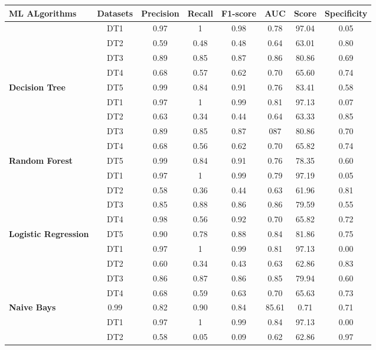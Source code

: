 \begin{table}[h]
\begin{tabular}{|l|c|c|c|c|c|c|c|}
\hline
\cline{2-8}
 \textbf{ML ALgorithms} &  \textbf{Datasets} & \textbf{Precision} & \textbf{Recall} & \textbf{F1-score}&\textbf{AUC} &\textbf{Score}&\textbf{Specificity}\tabularnewline
\hline
\cline{2-8}
 &  DT1 &0.97  & 1   & 0.98 & 0.78 & 97.04 & 0.05 \\
\cline{2-8}
& DT2 & 0.59 &0.48 &0.48  &0.64  &63.01  &0.80\\
\cline{2-8}
& DT3 &0.89  &0.85 &0.87  &0.86  &80.86  &0.69\\
\cline{2-8}
& DT4 &0.68  &0.57 &0.62  &0.70  &65.60  &0.74\\
\cline{2-8}
\multirow{-4}{*}{ \textbf{Decision Tree}}&   DT5 &0.99  &0.84 &0.91  &0.76  &83.41  &0.58\\
\hline
\cline{2-8}
&DT1 &0.97 &1   &0.99 &0.81 &97.13& 0.07\\
\cline{2-8}
 & DT2 &0.63  & 0.34  &0.44&0.64&63.33& 0.85\\
 \cline{2-8}
 & DT3 &0.89 &0.85 &0.87&087&80.86&0.70\\
 \cline{2-8}
 & DT4 &0.68 &0.56&0.62&0.70&65.82&0.74\\
\cline{2-8}
\multirow{-4}{*}{ \textbf{Random Forest}}&   DT5 &0.99 &0.84&0.91&0.76&78.35&0.60\\
\hline
\cline{2-8}
&DT1 &0.97 &1   &0.99 &0.79 &97.19&0.05 \\
\cline{2-8}
 &DT2 & 0.58 &0.36   &0.44&0.63&61.96&0.81\\
 \cline{2-8}
  &DT3 &0.85 &0.88 &0.86&0.86&79.59&0.55\\
  \cline{2-8}
  &DT4 &0.98 &0.56&0.92&0.70&65.82&0.72\\
  \cline{2-8}
\multirow{-4}{*}{ \textbf{Logistic Regression}}&   DT5 & 0.90&0.78&0.88&0.84&81.86&0.75\\
\hline
\cline{2-8}
& DT1 &0.97 &1   &0.99 &0.81 &97.13 &0.00\\
 \cline{2-8}
  &DT2 & 0.60 &0.34   &0.43&0.63&62.86&0.83 \\
  \cline{2-8}
  &DT3 &0.86 &0.87 &0.86&0.85&79.94&0.60\\
  \cline{2-8}
  &DT4 &0.68 &0.59&0.63&0.70&65.63&0.73\\
  \cline{2-8}
\multirow{-4}{*}{ \textbf{Naive Bays}}&0.99 &0.82&0.90&0.84&85.61&0.71&0.71\\
\hline
\cline{2-8}
&DT1 &0.97 &1   &0.99 &0.84 &97.13&0.00 \\
\cline{2-8}
  &DT2 &0.58  &0.05   & 0.09&0.62&62.86&0.97\\

\end{tabular}
\end{table}
